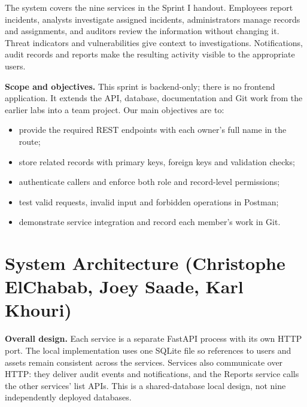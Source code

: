 \documentclass[11pt,a4paper]{article}
\begin{document}
The system covers the nine services in the Sprint I handout. Employees report incidents, analysts investigate assigned incidents, administrators manage records and assignments, and auditors review the information without changing it. Threat indicators and vulnerabilities give context to investigations. Notifications, audit records and reports make the resulting activity visible to the appropriate users.

\textbf{Scope and objectives.} This sprint is backend-only; there is no frontend application. It extends the API, database, documentation and Git work from the earlier labs into a team project. Our main objectives are to:
\begin{itemize}
\item provide the required REST endpoints with each owner's full name in the route;
\item store related records with primary keys, foreign keys and validation checks;
\item authenticate callers and enforce both role and record-level permissions;
\item test valid requests, invalid input and forbidden operations in Postman;
\item demonstrate service integration and record each member's work in Git.
\end{itemize}

\section{System Architecture (Christophe ElChabab, Joey Saade, Karl Khouri)}
\label{sec:architecture}
\textbf{Overall design.} Each service is a separate FastAPI process with its own HTTP port. The local implementation uses one SQLite file so references to users and assets remain consistent across the services. Services also communicate over HTTP: they deliver audit events and notifications, and the Reports service calls the other services' list APIs. This is a shared-database local design, not nine independently deployed databases.
\end{document}
